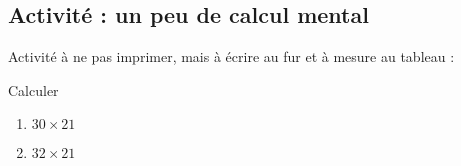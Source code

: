 
\subsection*{Activité : un peu de calcul mental}


Activité à ne pas imprimer, mais à écrire au fur et à mesure au tableau :

Calculer
\begin{enumerate}
    \item
        \( 30\times 21\)
    \item
        \( 32\times 21\)
\end{enumerate}
